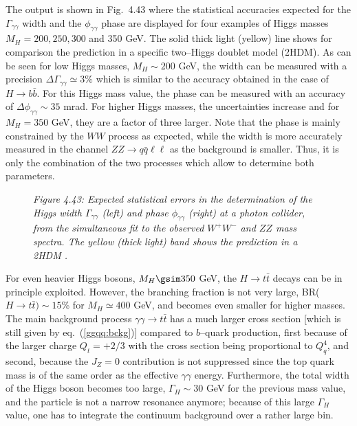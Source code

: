 The output is shown in Fig.~4.43 where the statistical accuracies expected for 
the $\Gamma_{\gamma \gamma}$ width and the $\phi_{\gamma \gamma}$ phase are 
displayed for four examples of Higgs masses $M_H=200, 250, 300$ and 350 GeV. 
The solid thick light (yellow) line shows for comparison the prediction in a 
specific two--Higgs doublet model (2HDM). As can be seen for low Higgs masses, 
$M_H \sim 200$ GeV, the width can be measured with a precision $\Delta \Gamma_{
\gamma \gamma} \simeq 3\%$ which is similar to the accuracy obtained in the case
of $H\to b \bar b$. For this Higgs mass value, the phase can be measured 
with an accuracy of $\Delta \phi_{\gamma \gamma} \sim 35$ mrad. For higher
Higgs masses, the uncertainties increase and for $M_H=350$ GeV, they are
a factor of three larger. Note that the phase is mainly constrained by the $WW$ 
process as expected, while the width is more accurately measured in the channel 
$ZZ \to q\bar q \ell \ell$ as the background is smaller. Thus, it is
only the combination of the two processes which allow to determine both 
parameters. 


\begin{figure}[h]
  \begin{center}
  \end{center}
  \vspace{-0.2cm}
{\it Figure 4.43: Expected statistical errors in the determination of the Higgs
width $\Gamma_{\gamma \gamma}$ (left) and phase $\phi_{\gamma \gamma}$ 
(right) at a photon collider, from the simultaneous fit to the observed $W^+ 
W^-$ and $ZZ$ mass spectra. The yellow (thick light) band shows the prediction 
in a 2HDM \cite{gam-HVV-Warsaw}. }
  \vspace{-0.2cm}
\end{figure}

For even heavier Higgs bosons, $M_H \gsim 350$ GeV, the $H \to t\bar{t}$ decays
can be in principle exploited. However, the branching fraction is not very
large, BR($H \to t\bar{t}) \sim 15$\% for $M_H \simeq 400$ GeV, and becomes even
smaller for higher masses. The main background
process $\gamma \gamma \to t\bar{t}$ has a much larger cross section  [which is
still given by eq.~(\ref{ggqq:bckg})] compared to $b$--quark production, first
because of the larger charge $Q_t=+2/3$  with the cross section being
proportional to $Q_q^4$, and second, because the $J_{Z}=0$  contribution is not
suppressed since the top quark mass is of the same order as the effective
$\gamma \gamma$ energy. Furthermore, the total width of the Higgs boson 
becomes too large, $\Gamma_H \sim 30$ GeV  for the previous mass value, and the
particle is not a narrow resonance anymore; because of this large $\Gamma_H$ 
value, one has to integrate the continuum background over a rather large bin. \s

